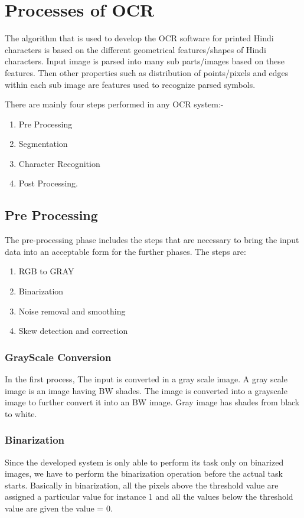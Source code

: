 \chapter{Processes of OCR}
\label{ch:tech_stuff}


The algorithm that is used to develop the OCR software for printed Hindi characters is based on the different geometrical features/shapes of Hindi characters. Input image is parsed into many sub parts/images based on these features. Then other properties such as distribution of points/pixels and edges within each sub image are features used to recognize parsed symbols.

There are mainly four steps performed in any OCR system:- 
\begin{enumerate}
\item Pre Processing 
\item Segmentation 
\item Character Recognition 
\item Post Processing.
\end{enumerate}

\section{Pre Processing}
The pre-processing phase includes the steps that are necessary to bring the input data into an acceptable form for the further phases. The steps are: 
\begin{enumerate}
\item RGB to GRAY
\item Binarization 
\item Noise removal and smoothing 
\item Skew detection and correction
\end{enumerate}

\subsection{GrayScale Conversion}
In the first process, The input is converted in a gray scale image. A gray scale image is an image having BW shades. The image is converted into a grayscale image to further convert it into an BW image. Gray image has shades from black to white.

\subsection{Binarization}
Since the developed system is only able to perform its task only on binarized images, we have to perform the binarization operation before the actual task starts.
Basically in binarization, all the pixels above the threshold value are assigned a particular value for instance 1 and all the values below the threshold value are given the value = 0.
